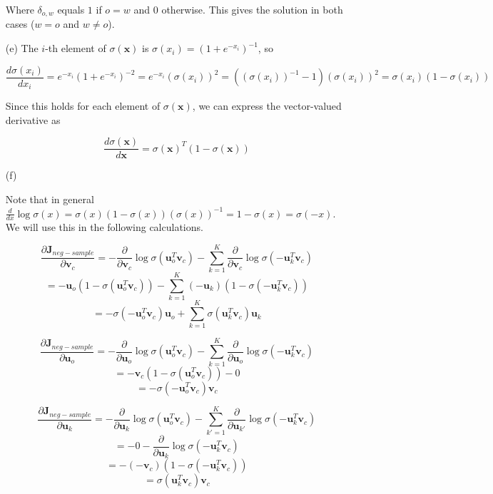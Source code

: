 \documentclass[12pt,letterpaper]{article}
\begin{document}
\begin{itemize}
    Where $\delta_{o,w}$ equals $1$ if $o = w$ and $0$ otherwise. This gives the solution in both cases ($w=o$ and $w \neq o$).
    
    \item[(e)]
    The $i$-th element of $\sigma(\mathbf{x})$ is $\sigma(x_i) = (1+e^{-x_i})^{-1}$, so
    
    $$\frac{d \sigma(x_i)}{d x_i} = e^{-x_i}(1 + e^{-x_i})^{-2} = e^{-x_i}(\sigma(x_i))^2 = ((\sigma(x_i))^{-1}-1)(\sigma(x_i))^2 = \sigma(x_i)(1 - \sigma(x_i))$$
    
    Since this holds for each element of $\sigma(\mathbf{x})$, we can express the vector-valued derivative as
    
    $$\frac{d \sigma(\mathbf{x})}{d \mathbf{x}} = \sigma(\mathbf{x})^T(1 - \sigma(\mathbf{x}))$$
    
    
    \item[(f)]
    
    Note that in general $\frac{d}{dx} \log \sigma(x) = \sigma(x)(1-\sigma(x))(\sigma(x))^{-1} = 1 - \sigma(x) = \sigma(-x)$. We will use this in the following calculations.
    
     $$\frac{\partial \mathbf{J}_{neg-sample}}{\partial \mathbf{v}_c} = - \frac{\partial}{\partial \mathbf{v}_c} \log \sigma(\mathbf{u}_o^T\mathbf{v}_c) - \sum_{k=1}^K \frac{\partial}{\partial \mathbf{v}_c} \log \sigma(-\mathbf{u}_k^T\mathbf{v}_c)$$
     $$= - \mathbf{u}_o (1-\sigma(\mathbf{u}_o^T \mathbf{v}_c)) - \sum_{k=1}^K (-\mathbf{u}_k)(1- \sigma(-\mathbf{u}_k^T\mathbf{v}_c))$$
     $$= -\sigma(-\mathbf{u}_o^T \mathbf{v}_c)\mathbf{u}_o + \sum_{k=1}^K \sigma(\mathbf{u}_k^T\mathbf{v}_c) \mathbf{u}_k$$
     
     $$\frac{\partial \mathbf{J}_{neg-sample}}{\partial \mathbf{u}_o} = - \frac{\partial}{\partial \mathbf{u}_o} \log \sigma(\mathbf{u}_o^T\mathbf{v}_c) - \sum_{k=1}^K \frac{\partial}{\partial \mathbf{u}_o} \log \sigma(-\mathbf{u}_k^T\mathbf{v}_c)$$
     $$= - \mathbf{v}_c (1 - \sigma(\mathbf{u}_o^T\mathbf{v}_c)) - 0$$
     $$= -\sigma(-\mathbf{u}_o^T\mathbf{v}_c) \mathbf{v}_c$$
     
     $$\frac{\partial \mathbf{J}_{neg-sample}}{\partial \mathbf{u}_k} = - \frac{\partial}{\partial \mathbf{u}_k} \log \sigma(\mathbf{u}_o^T\mathbf{v}_c) - \sum_{k'=1}^K \frac{\partial}{\partial \mathbf{u}_{k'}} \log \sigma(-\mathbf{u}_k^T\mathbf{v}_c)$$
     $$= - 0 - \frac{\partial}{\partial \mathbf{u}_k} \log \sigma(-\mathbf{u}_k^T\mathbf{v}_c)$$
     $$= -(-\mathbf{v}_c)(1-\sigma(-\mathbf{u}_k^T\mathbf{v}_c))$$
     $$= \sigma(\mathbf{u}_k^T\mathbf{v}_c)\mathbf{v}_c$$
    

\end{itemize}
\end{document}
